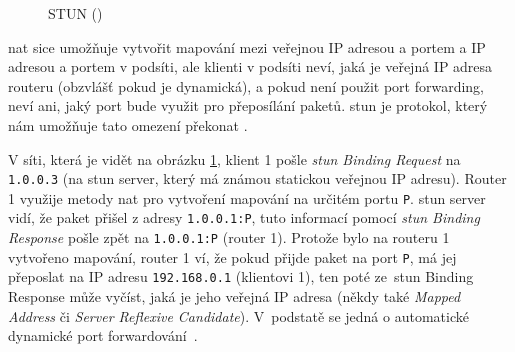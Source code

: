 \begin{figure}[H]
    \centering
    \caption{STUN (\publicPrivateIP)}
    \label{stunFig}
\end{figure}

\gls{nat} sice umožňuje vytvořit mapování mezi veřejnou IP adresou a portem a IP
adresou a portem v podsíti, ale klienti v podsíti neví, jaká je veřejná IP
adresa routeru (obzvlášť pokud je dynamická), a pokud není použit port
forwarding, neví ani, jaký port bude využit pro přeposílání paketů. \gls{stun}
je protokol, který nám umožňuje tato omezení překonat
\parencite{WebRTCForTheCurious}.

V síti, která je vidět na obrázku \ref{stunFig}, klient 1 pošle
\textit{\gls{stun} Binding Request} na \texttt{1.0.0.3} (na
\gls{stun} server, který má známou statickou veřejnou IP adresu). Router 1
využije metody \gls{nat} pro vytvoření mapování na určitém portu
\texttt{P}. \gls{stun} server vidí, že paket přišel z adresy
\texttt{1.0.0.1:P}, tuto informací pomocí \textit{\gls{stun}
    Binding Response} pošle zpět na \texttt{1.0.0.1:P} (router 1).
Protože bylo na routeru 1 vytvořeno mapování, router 1 ví, že pokud přijde
paket na port \texttt{P}, má jej přeposlat na IP adresu
\texttt{192.168.0.1} (klientovi 1), ten poté ze~\gls{stun} Binding
Response může vyčíst, jaká je jeho veřejná IP adresa (někdy také
\textit{Mapped Address} či \textit{Server Reflexive Candidate}). V~podstatě
se jedná o automatické dynamické port
forwardování~\parencite{WebRTCForTheCurious}.

